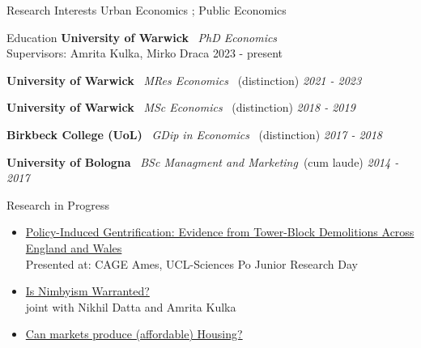 \documentclass{cv_EB}
\begin{document}

\begin{rSection}{Research Interests}
	\smallskip
	Urban Economics ; Public Economics
\end{rSection}



%
%
%




\begin{rSection}{Education}
\smallskip
{\bf University of Warwick} \ {\em PhD Economics} \\ {Supervisors: Amrita Kulka, Mirko Draca}  \hfill {2023 - present}

{\bf University of Warwick} \ {\em MRes Economics} \ {(distinction)} \hfill {\em 2021 - 2023} 

{\bf University of Warwick} \ {\em MSc Economics} \ {(distinction)} \hfill {\em 2018 - 2019} 

{\bf Birkbeck College (UoL)} \ {\em GDip in Economics} \ {(distinction)} \hfill {\em 2017 - 2018} 

{\bf University of Bologna} \ {\em BSc Managment and Marketing}\ {(cum laude)} \hfill {\em 2014 - 2017} 

\end{rSection}


\begin{rSection}{Research in Progress}
\smallskip

\begin{itemize}[leftmargin=0em]
	
	\item \href{}{Policy-Induced Gentrification: Evidence from Tower-Block Demolitions Across England and Wales} \hspace{0.5em}
	\\ {\scriptsize Presented at: CAGE Ames, UCL-Sciences Po Junior Research Day}

\medskip
		
\item \href{}{Is Nimbyism Warranted?}
\\ {\small joint with Nikhil Datta and Amrita Kulka}
 
\medskip
		
\item \href{}{Can markets produce (affordable) Housing?} 


\end{itemize}

\end{rSection}
\end{document}
